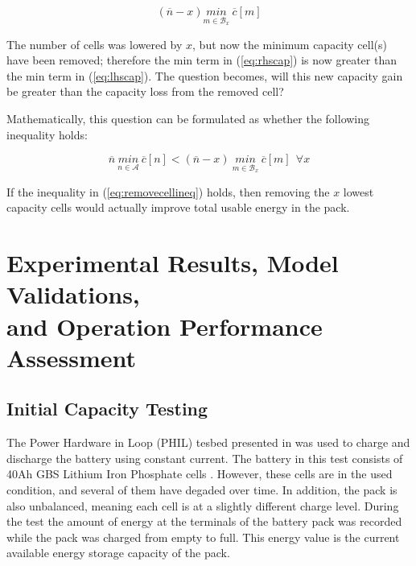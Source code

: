 \documentclass[10pt,twocolumn]{IEEEtran}
\begin{document}
\begin{equation}
(\overline{n}-x) \underset{m\in \mathcal{B}_x}{min} \ \overline c[m]
\label{eq:rhscap}
\end{equation}

The number of cells was lowered by $x$, but now the minimum capacity cell(s) have been removed; therefore the min term in (\ref{eq:rhscap}) is now greater than the min term in (\ref{eq:lhscap}). The question becomes, will this new capacity gain be greater than the capacity loss from the removed cell?

Mathematically, this question can be formulated as whether the following inequality holds:

\begin{equation}
\overline{n} \  \underset{n\in \mathcal{A}}{min} \ \overline c[n] < (\overline{n}-x) \ \underset{m\in \mathcal{B}_x}{min} \ \overline c[m] \ \  \forall x
\label{eq:removecellineq}
\end{equation}

If the inequality in (\ref{eq:removecellineq}) holds, then removing the $x$ lowest capacity cells would actually improve total usable energy in the pack. 



\section{Experimental Results, Model Validations,\\ and Operation Performance Assessment} \label{sec:results}


\subsection{Initial Capacity Testing} \label{sec:capacity_test_1}

The Power Hardware in Loop (PHIL) tesbed presented in \cite{NAPS_RTDS} was used to charge and discharge the battery using constant current. The battery in this test consists of 40Ah GBS Lithium Iron Phosphate cells \cite{elitepower}. However, these cells are in the used condition, and several of them have degaded over time. In addition, the pack is also unbalanced, meaning each cell is at a slightly different charge level. During the test the amount of energy at the terminals of the battery pack was recorded while the pack was charged from empty to full. This energy value is the current available energy storage capacity of the pack. 
\end{document}
